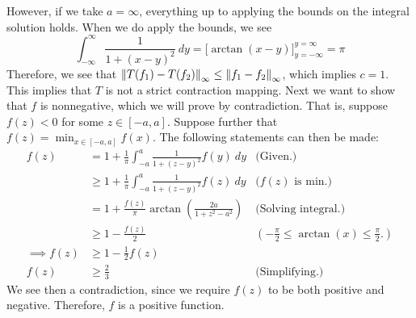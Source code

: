 \begin{solution}
    \newpage
    However, if we take $a = \infty$, everything up to applying the bounds on the integral solution holds. When we do apply the bounds, we see
    \[\int_{-\infty}^\infty \frac{1}{1+(x - y)^2} \ dy = \Big[\arctan (x - y) \Big]_{y = -\infty}^{y = \infty} = \pi\]
    Therefore, we see that $ \norm{T(f_1) - T(f_2)}_\infty \leq \norm{f_1 - f_2}_\infty$, which implies $c = 1$. This implies that $T$ is not a strict contraction mapping. Next we want to show that $f$ is nonnegative, which we will prove by contradiction. That is, suppose $f(z) < 0$ for some $z \in [-a, a]$. Suppose further that $f(z) = \min_{x \in [-a, a]} f(x)$. The following statements can then be made:
    \tightalignbreak
    \begin{align*}
        f(z) &= 1 + \frac{1}{\pi}\int_{-a}^a \frac{1}{1 + (z - y)^2} f(y) \ dy &\text{(Given.)}\\
        &\geq 1 + \frac{1}{\pi}\int_{-a}^a \frac{1}{1 + (z - y)^2} f(z) \ dy &\text{($f(z)$ is min.)}\\
        &= 1 + \frac{ f(z)}{\pi} \arctan\left( \frac{2a}{1 + z^2 - a^2} \right) &\text{(Solving integral.)}\\
        &\geq 1 - \frac{f(z)}{2} &(-\frac{\pi}{2} \leq \arctan (x) \leq \frac{\pi}{2}.)\\
        \implies f(z) &\geq 1 - \frac{1}{2}f(z) \\
        f(z) &\geq \frac{2}{3} &\text{(Simplifying.)}
    \end{align*}
    \vspace{-6mm}\alignbreak
    We see then a contradiction, since we require $f(z)$ to be both positive and negative. Therefore, $f$ is a positive function. 
\end{solution}

\newpage


